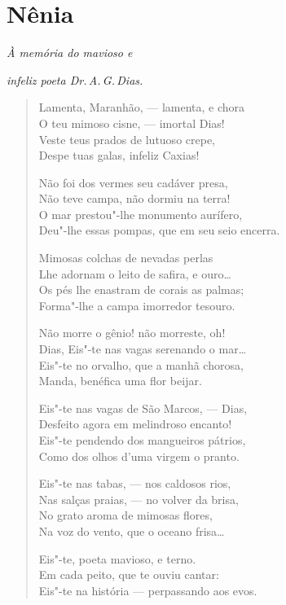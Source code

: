 \chapter{Nênia}

\hfill{}\emph{À memória do mavioso e}

\hfill{}\emph{infeliz poeta Dr.\,A.\,G.\,Dias.}

\begin{verse}
Lamenta, Maranhão, --- lamenta, e chora\\
O teu mimoso cisne, --- imortal Dias!\\
Veste teus prados de lutuoso crepe,\\
Despe tuas galas, infeliz Caxias!

Não foi dos vermes seu cadáver presa,\\
Não teve campa, não dormiu na terra!\\
O mar prestou"-lhe monumento aurífero,\\
Deu"-lhe essas pompas, que em seu seio encerra.

Mimosas colchas de nevadas perlas\\
Lhe adornam o leito de safira, e ouro\ldots{}\\
Os pés lhe enastram de corais as palmas;\\
Forma"-lhe a campa imorredor tesouro.

Não morre o gênio! não morreste, oh!\\
Dias, Eis"-te nas vagas serenando o mar\ldots{}\\
Eis"-te no orvalho, que a manhã chorosa,\\
Manda, benéfica uma flor beijar.

Eis"-te nas vagas de São Marcos, --- Dias,\\
Desfeito agora em melindroso encanto!\\
Eis"-te pendendo dos mangueiros pátrios,\\
Como dos olhos d'uma virgem o pranto.

Eis"-te nas tabas, --- nos caldosos rios,\\
Nas salças praias, --- no volver da brisa,\\
No grato aroma de mimosas flores,\\
Na voz do vento, que o oceano frisa\ldots{}

Eis"-te, poeta mavioso, e terno.\\
Em cada peito, que te ouviu cantar:\\
Eis"-te na história --- perpassando aos evos.


\end{verse}

